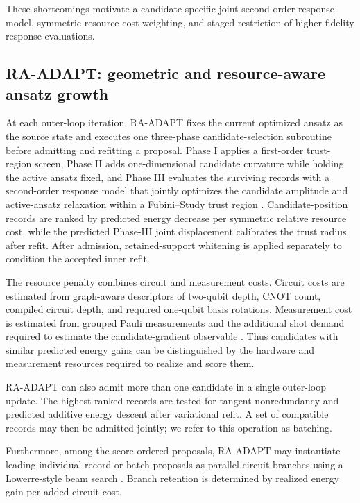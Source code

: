 \documentclass[
  reprint,
  amsmath,
  amssymb,
  aps,
  pra,
  nofootinbib,
  superscriptaddress,
  floatfix
]{revtex4-2}
\begin{document}
These shortcomings motivate a candidate-specific joint second-order response model, symmetric resource-cost weighting, and staged restriction of higher-fidelity response evaluations.




%
\subsection{\textsc{RA-ADAPT}: geometric and resource-aware ansatz growth}
At each outer-loop iteration, \textsc{RA-ADAPT} fixes the current optimized
ansatz as the source state and executes one three-phase candidate-selection
subroutine before admitting and refitting a proposal. Phase I applies a
first-order trust-region screen, Phase II adds one-dimensional candidate
curvature while holding the active ansatz fixed, and Phase III evaluates the
surviving records with a second-order response model that jointly optimizes the
candidate amplitude and active-ansatz relaxation within a Fubini--Study trust
region
\cite{Nocedal2006TrustRegion,ProvostVallee1980,Stokes2020QNG,Haug2021Capacity,VanStraaten2021MeasurementCost}.
Candidate-position records are ranked by predicted energy decrease per
symmetric relative resource cost, while the predicted Phase-III joint
displacement calibrates the trust radius after refit. After admission,
retained-support whitening is applied separately to condition the accepted
inner refit.

The resource penalty combines circuit and measurement costs. Circuit costs are estimated from graph-aware descriptors of two-qubit depth, CNOT count, compiled circuit depth, and required one-qubit basis rotations. Measurement cost is estimated from grouped Pauli measurements and the additional shot demand required to estimate the candidate-gradient observable \cite{Verteletskyi2020CliqueCover,Yen2020CompatibleMeasurements,Ikhtiarudin2025ShotEfficient}. Thus candidates with similar predicted energy gains can be distinguished by the hardware and measurement resources required to realize and score them.

\textsc{RA-ADAPT} can also admit more than one candidate in a single outer-loop update. The highest-ranked records are tested for tangent nonredundancy and predicted additive energy descent after variational refit. A set of compatible records may then be admitted jointly; we refer to this operation as batching.

Furthermore, among the score-ordered proposals, \textsc{RA-ADAPT} may
instantiate leading individual-record or batch proposals as parallel circuit branches
using a Lowerre-style beam search \cite{Lowerre1976Beam}. Branch retention is
determined by realized energy gain per added circuit cost.
\end{document}
